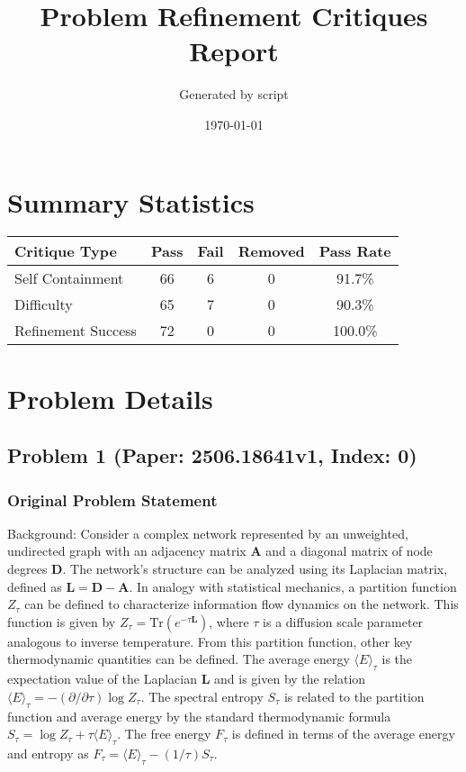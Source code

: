 \documentclass[10pt]{article}
\title{Problem Refinement Critiques Report}
\author{Generated by script}
\date{\today}
\begin{document}
\maketitle

\section*{Summary Statistics}
\begin{center}
\begin{longtable}{|l|c|c|c|c|}
\hline
\textbf{Critique Type} & \textbf{Pass} & \textbf{Fail} & \textbf{Removed} & \textbf{Pass Rate} \\
\hline
\endfirsthead
\hline
\endfoot
Self Containment & 66 & 6 & 0 & 91.7\% \\
Difficulty & 65 & 7 & 0 & 90.3\% \\
Refinement Success & 72 & 0 & 0 & 100.0\% \\
\hline
\end{longtable}
\end{center}
\section*{Problem Details}

\subsection*{Problem 1 (Paper: 2506.18641v1, Index: 0)}

\subsubsection*{Original Problem Statement}
Background:
Consider a complex network represented by an unweighted, undirected graph with an adjacency matrix $\mathbf{A}$ and a diagonal matrix of node degrees $\mathbf{D}$. The network's structure can be analyzed using its Laplacian matrix, defined as $\mathbf{L = D - A}$. In analogy with statistical mechanics, a partition function $Z_{\tau}$ can be defined to characterize information flow dynamics on the network. This function is given by $Z_{\tau} = \text{Tr}(e^{-\tau \mathbf{L}})$, where $\tau$ is a diffusion scale parameter analogous to inverse temperature. From this partition function, other key thermodynamic quantities can be defined. The average energy $\langle E \rangle_{\tau}$ is the expectation value of the Laplacian $\mathbf{L}$ and is given by the relation $\langle E \rangle_{\tau} = - (\partial/\partial\tau) \log Z_{\tau}$. The spectral entropy $S_{\tau}$ is related to the partition function and average energy by the standard thermodynamic formula $S_{\tau} = \log Z_{\tau} + \tau \langle E \rangle_{\tau}$. The free energy $F_{\tau}$ is defined in terms of the average energy and entropy as $F_{\tau} = \langle E \rangle_{\tau} - (1/\tau) S_{\tau}$.
\end{document}
